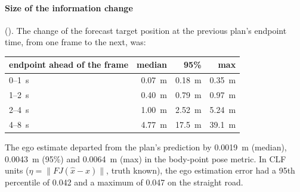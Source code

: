 \documentclass[11pt]{article}
\begin{document}
\paragraph{Size of the information change} ().
The change of the forecast target position at the previous plan's endpoint
time, from one frame to the next, was:
\begin{center}
\begin{tabular}{lrrr}
\toprule
endpoint ahead of the frame & median & 95\% & max\\
\midrule
0--1~s & 0.07~m & 0.18~m & 0.35~m\\
1--2~s & 0.40~m & 0.79~m & 0.97~m\\
2--4~s & 1.00~m & 2.52~m & 5.24~m\\
4--8~s & 4.77~m & 17.5~m & 39.1~m\\
\bottomrule
\end{tabular}
\end{center}
The ego estimate departed from the plan's prediction by 0.0019~m (median),
0.0043~m (95\%) and 0.0064~m (max) in the body-point pose metric. In CLF
units ($\eta=\|F J(\hat x-x)\|$, truth known), the ego estimation error had a
95th percentile of 0.042 and a maximum of 0.047 on the straight road.
\end{document}
